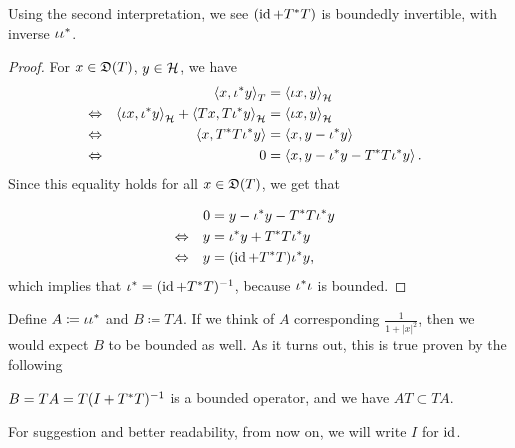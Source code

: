 \documentclass[a4paper,10pt]{article}
\begin{document}
\begin{prop}
 Using the second interpretation, we see $(\operatorname{id} + T ^{*} T)$ is boundedly invertible, with inverse $\iota \iota ^{*}$.
\end{prop}
\begin{proof}
  For $x \in \mathfrak{D}(T)$, $y \in \mathcal{H}$,  we have
  \begin{align*}
  &\quad & \left\langle x, \iota ^{*} y \right\rangle_T &= \left\langle \iota x, y \right\rangle_{\mathcal{H}}  &\\
  &\Leftrightarrow & \left\langle \iota x ,\iota ^{*} y \right\rangle_{\mathcal{H}} + \left\langle Tx, T\iota ^{*} y \right\rangle_{\mathcal{H}} &= \left\langle \iota x, y \right\rangle_{\mathcal{H}}  &\\
  &\Leftrightarrow & \left\langle x, T ^* T \iota ^{*} y \right\rangle &= \left\langle x, y - \iota ^{*} y \right\rangle &\\
  &\Leftrightarrow & 0 &= \left\langle x, y - \iota ^{*} y - T ^* T \iota ^{*} y \right\rangle. & 
  \end{align*}
  Since this equality holds for all $x \in \mathfrak{D}(T)$, we get that 

  \begin{align*}
  & \quad & 0&= y - \iota ^{*} y - T ^* T \iota ^{*} y  & \\
  & \Leftrightarrow  & y &= \iota ^{*} y + T ^{*} T \iota ^{*} y& \\
  & \Leftrightarrow & y &= (\operatorname{id} + T ^{*} T) \iota ^{*} y, &
  \end{align*}
  which implies that $  \iota ^{*} = ( \operatorname{id} + T ^{*} T) ^{-1}$, because $\iota ^{*} \iota$ is bounded.
\end{proof}

Define $A \coloneqq \iota \iota ^{*}$ and $B \coloneqq TA$. If we think of $A$ corresponding $\frac{1}{1 + |x|^2}$, then we would expect $B$ to be bounded as well. As it turns out, this is true proven by the following

\begin{lem}
 $B = TA = T(I + T ^{*} T)^{-1}$ is a bounded operator, and we have $AT \subset TA$.
\end{lem}

\begin{rem}
 For suggestion and better readability, from now on, we will write $I$ for $\operatorname{id}$.
\end{rem}
\end{document}
